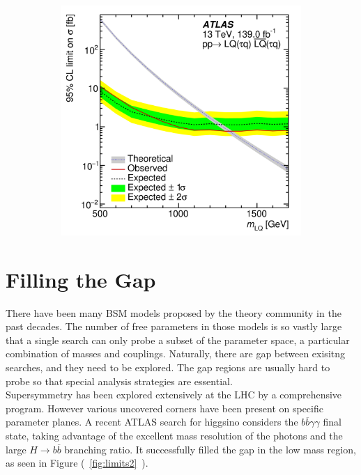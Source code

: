 \documentclass{moriond}
\begin{document}
\begin{figure}[htp]
\begin{subfigure}[b]{0.32\textwidth}
         \centering
         \includegraphics[width=\textwidth]{excited}
         \caption{}
         \label{fig:excited}
     \end{subfigure}
        \caption{}
        \label{fig:limits1}
\end{figure}
\section{Filling the Gap}

There have been many BSM models proposed by the theory community in the past
decades. The number of free parameters in those models is so vastly large that
a single search can only probe a subset of the parameter space, a particular
combination of masses and couplings. Naturally, there are gap between exisitng
searches, and they need to be explored. The gap regions are usually hard to
probe so that special analysis strategies are essential.\\

Supersymmetry has been explored extensively at the LHC by a comprehensive
program. However various uncovered corners have been present on specific
parameter planes. A recent ATLAS search for higgsino considers the
$b\overline{b}\gamma\gamma$ final state, taking advantage of the excellent mass
resolution of the photons and the large $H\rightarrow b\overline{b}$ branching
ratio. It successfully filled the gap in the low mass region, as seen in Figure
(~\ref{fig:limits2}~).\\
\end{document}
